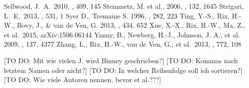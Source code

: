 \documentclass[12pt,preprint]{aastex}
\begin{document}
\begin{thebibliography}{}
 Sellwood, J.~A.\ 2010, \mnras, 409, 145 
 Steinmetz, M. et al., 2006, \aj, 132, 1645
 Strigari, L.~E.\ 2013, \physrep, 531, 1 
 Syer D., Tremaine S. 1996, \mnras, 282, 223
 Ting, Y.-S., Rix, H.-W., Bovy, J., \& van de Ven, G. 2013, \mnras, 434, 652
 Xue, X.-X., Rix, H.-W., Ma, Z., et al.\ 2015, arXiv:1506.06144 
 Yanny, B., Newberg, H.-J., Johnson, J. A., et al. 2009, \aj, 137, 4377 
 Zhang, L., Rix, H.-W., van de Ven, G., et al.\ 2013, \apj, 772, 108
\end{thebibliography}

[TO DO: Mit wie vielen J. wird Binney geschrieben?] [TO DO: Kommas nach letztem Namen oder nicht?] [TO DO: In welcher Reihenfolge soll ich sortieren?] [TO DO: Wie viele Autoren nennen, bevor et al.???]

%
\end{document}
